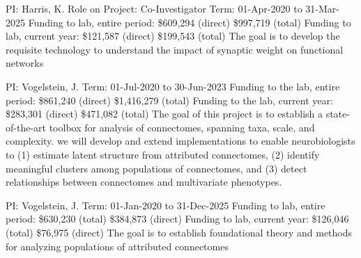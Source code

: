 \documentclass[10pt,colorlinks=true,urlcolor=blue]{moderncv}
\begin{document}
{\newline PI: Harris, K.
\newline Role on Project: Co-Investigator
\newline Term: 01-Apr-2020 to 31-Mar-2025
\newline Funding to lab, entire period: \$609,294 (direct) \$997,719 (total)
\newline Funding to lab, current year: \$121,587 (direct) \$199,543 (total)
\newline The goal is to develop the requisite technology to understand the impact of synaptic weight on functional networks}{}{}{}

{\newline PI: Vogelstein, J.
\newline Term: 01-Jul-2020 to 30-Jun-2023
\newline Funding to the lab, entire period: \$861,240 (direct) \$1,416,279 (total)
\newline Funding to the lab, current year: \$283,301 (direct) \$471,082 (total)
\newline The goal of this project is to establish a state-of-the-art toolbox for analysis of connectomes, spanning taxa, scale, and complexity. we will develop and extend implementations to enable neurobiologists to (1) estimate latent structure from attributed connectomes, (2) identify meaningful clusters among populations of connectomes, and (3) detect relationships between connectomes and multivariate phenotypes.}{}{}{}

{\newline PI: Vogelstein, J.
\newline Term: 01-Jan-2020 to 31-Dec-2025
\newline Funding to lab, entire period: \$630,230 (total) \$384,873 (direct)
\newline Funding to lab, current year: \$126,046 (total) \$76,975 (direct)
\newline The goal is to establish foundational theory and methods for analyzing populations of
attributed connectomes}{}{}{}
\end{document}
